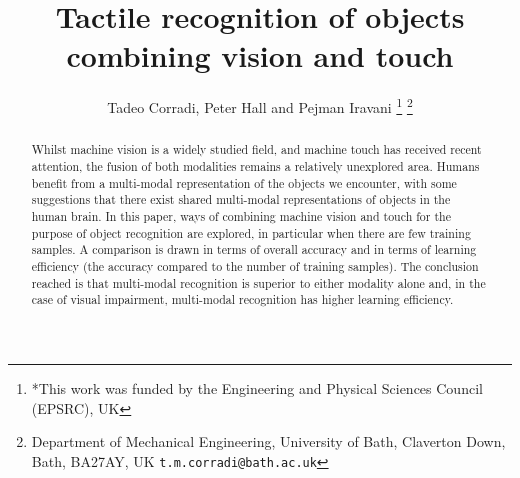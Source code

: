\documentclass[letterpaper, 10 pt, conference]{ieeeconf}  %
\title{Tactile recognition of objects combining vision and touch}
\author{Tadeo Corradi, Peter Hall and Pejman Iravani%
	\thanks{*This work was funded by the Engineering and Physical Sciences Council (EPSRC), UK}%
	\thanks{Department of Mechanical Engineering, University of Bath, Claverton Down, Bath, BA27AY, UK
		{\tt\small t.m.corradi@bath.ac.uk}}%
}
\begin{document}
\maketitle

\begin{abstract}
Whilst machine vision is a widely studied field, and machine touch has received recent attention, the fusion of both modalities remains a relatively unexplored area.
Humans benefit from a multi-modal representation of the objects we encounter, with some suggestions that there exist shared multi-modal representations of objects in the human brain.
In this paper, ways of combining machine vision and touch for the purpose of object recognition are explored, in particular when there are few training samples.
A comparison is drawn in terms of overall accuracy and in terms of learning efficiency (the accuracy compared to the number of training samples).
The conclusion reached is that multi-modal recognition is superior to either modality alone and, in the case of visual impairment, multi-modal recognition has higher learning efficiency.
\end{abstract}
\end{document}

